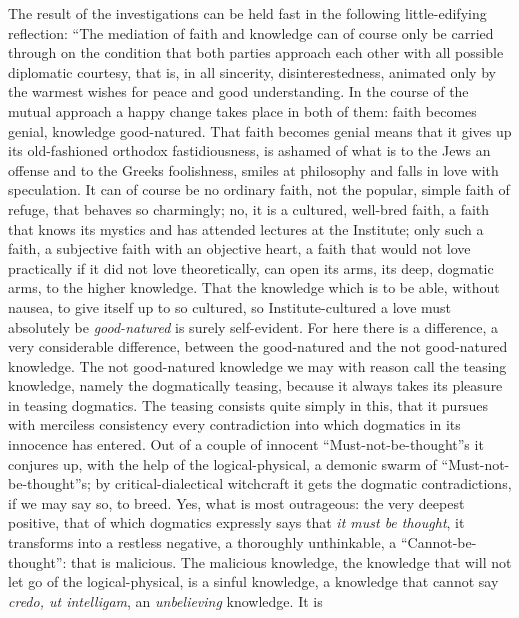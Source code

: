 \documentclass[12pt]{book}
\newcommand{\opage}[1]{\marginnote{\footnotesize\textit{[#1]}}}
\begin{document}
The result of the investigations can be held fast in the following
little-edifying reflection: ``The mediation of faith and knowledge can of
course only be carried through on the
\opage{243}\setcounter{footnote}{0}%
condition that both parties approach each other with all possible diplomatic
courtesy, that is, in all sincerity, disinterestedness, animated only by the
warmest wishes for peace and good understanding. In the course of the mutual
approach a happy change takes place in both of them: faith becomes genial,
knowledge good-natured. That faith becomes genial means that it gives up its
old-fashioned orthodox fastidiousness, is ashamed of what is to the Jews an
offense and to the Greeks foolishness, smiles at philosophy and falls in love
with speculation. It can of course be no ordinary faith, not the popular,
simple faith of refuge, that behaves so charmingly; no, it is a cultured,
well-bred faith, a faith that knows its mystics and has attended lectures at
the Institute; only such a faith, a subjective faith with an objective heart,
a faith that would not love practically if it did not love theoretically, can
open its arms, its deep, dogmatic arms, to the higher knowledge. That the
knowledge which is to be able, without nausea, to give itself up to so
cultured, so Institute-cultured a love must absolutely be \emph{good-natured}
is surely self-evident. For here there is a difference, a very considerable
difference, between the good-natured and the not good-natured knowledge. The
not good-natured knowledge we may with reason call the teasing knowledge,
namely the dogmatically teasing, because it always takes its pleasure in
teasing dogmatics. The teasing consists quite simply in this, that it pursues
with merciless consistency every contradiction into which dogmatics in its
innocence has entered. Out of a couple of innocent ``Must-not-be-thought''s it
conjures up, with the help of the logical-physical, a demonic swarm of
``Must-not-be-thought''s; by critical-dialectical witchcraft it gets the
dogmatic contradictions, if we may say so, to breed.
\opage{244}\setcounter{footnote}{0}%
Yes, what is most outrageous: the very deepest positive, that of which
dogmatics expressly says that \emph{it must be thought}, it transforms into a
restless negative, a thoroughly unthinkable, a ``Cannot-be-thought'': that is
malicious. The malicious knowledge, the knowledge that will not let go of the
logical-physical, is a sinful knowledge, a knowledge that cannot say
\textit{credo, ut intelligam}, an \emph{unbelieving} knowledge. It is
\end{document}
